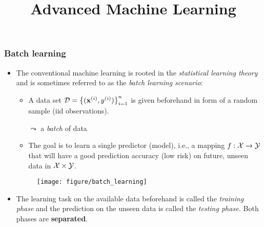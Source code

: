 \documentclass[11pt,compress,t,notes=noshow, xcolor=table]{beamer}
\title{Advanced Machine Learning}
\date{}
\begin{document}



\sloppy

\begin{frame} [t]
	\frametitle{Batch learning}
	\small
	\begin{itemize} 
			  \item The conventional machine learning is rooted in the \emph{statistical learning theory} and is sometimes referred to as the \emph{batch learning scenario}:	
			  \lz
			  
%			
			\begin{minipage}{.6\textwidth}
			\begin{itemize}\small
%				
				  \item A data set $\mathcal{D} = \big\{(\mathbf{x}^{(i)},y^{(i)})\big\}_{i=1}^n $   is given beforehand in form of a random sample (iid observations).
%				  
				  \item [$\leadsto$] a \emph{batch} of data
%				  
				  \item The goal is to learn a single predictor (model), i.e., a mapping $f:\mathcal{X} \to \mathcal{Y}$ that will have a good prediction accuracy (low risk) on future, unseen data in $\mathcal{X} \times \mathcal{Y}$. 
%				  
			\end{itemize}
		\end{minipage}
		\begin{minipage}{.3\textwidth}
			\begin{figure}
				\centering
				\texttt{[image: figure/batch\_learning]}
			\end{figure}
		\end{minipage}
		\lz
		  \item The learning task on the available data beforehand is called the \emph{training phase} and the prediction on the unseen data is called the \emph{testing phase.} Both phases are \textbf{separated}.
	\end{itemize}
\end{frame}
\end{document}
